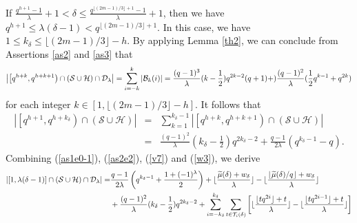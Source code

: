 \documentclass[journal,onecolumn]{IEEEtran}
\begin{document}
If 
$\frac{q^{h+1}-1}{\lambda}+1<\delta\leq  \frac{q^{\lfloor (2m-1)/3\rfloor+1}-1}{\lambda}+1$, then we have $q^{h+1}\leq \lambda(\delta-1)< q^{\lfloor (2m-1)/3\rfloor+1}$. In this case, we have 
 $1\leq k_\delta\leq \lfloor ({2m-1})/{3}\rfloor-h.$
By applying Lemma  \ref{th2}, we can conclude from Assertions \ref{as2} and \ref{as3}  that 
\begin{equation} \notag
\left|\left[q^{h+k},q^{h+k+1}\right)\cap (\mathcal{S}\cup \mathcal{H})\cap \mathcal{D}_{\lambda}\right|  =\sum\limits_{i=-k}^k  |\mathcal{B}_k(i) |
    =\frac{(q-1)^3}{\lambda} (k-\frac{1}{2})q^{2k-2}(q+1) 
+ )\frac{(q-1)^2}{\lambda}(\frac{1}{2}q^{k-1}+q^{2k})
\end{equation}
for  each integer $k\in [1, \lfloor ({2m-1})/{3}\rfloor-h]$. 
It follows that
\begin{eqnarray}
\left|\left[q^{h+1},q^{h+k_{\delta}}\right)\cap (\mathcal{S}\cup \mathcal{H})\right| & =&\sum\limits_{k=1}^{k_{\delta}-1}
\left|\left[q^{h+k},q^{h+k+1}\right)\cap  (\mathcal{S}\cup \mathcal{H})\right|  \label{w3} \\ 
&=&\frac{(q-1)^2}{\lambda} (k_{\delta}-\frac{1}{2})q^{2k_{\delta}-2} +\frac{q-1}{2\lambda}(q^{k_{\delta}-1}-q).  \nonumber
\end{eqnarray}
Combining (\ref{as1e0-1}), (\ref{as2e2}), (\ref{v7}) and (\ref{w3}), we derive   
\begin{equation}\notag
\begin{split}
    \left| \left[1,\lambda(\delta-1)\right]\cap (\mathcal{S}\cup \mathcal{H})\cap \mathcal{D}_{\lambda} \right| = &\frac{q-1}{2\lambda}\left(q^{k_{\delta}-1}+ \frac{1+(-1)^{\lambda}}{2}\right) +  \lfloor \frac{\widetilde{\mu}(\delta)+w_{\delta}}{\lambda}\rfloor-\lfloor \frac{\lfloor\widetilde{\mu}(\delta)/q\rfloor+w_{\delta}}{\lambda}\rfloor  \\
        & + \frac{(q-1)^2}{\lambda} (k_{\delta}-\frac{1}{2})q^{2k_{\delta}-2}  +\sum\limits_{i=-k_{\delta}}^{k_{\delta}}\sum\limits_{t\in {\mathcal{T}}_i(\delta)}\left[\lfloor \frac{\lfloor tq^{2i}\rfloor+t}{\lambda}\rfloor -\lfloor \frac{\lfloor tq^{2i-1}\rfloor+t}{\lambda}\rfloor  
        \right] 
        \end{split}
\end{equation}
\end{document}

